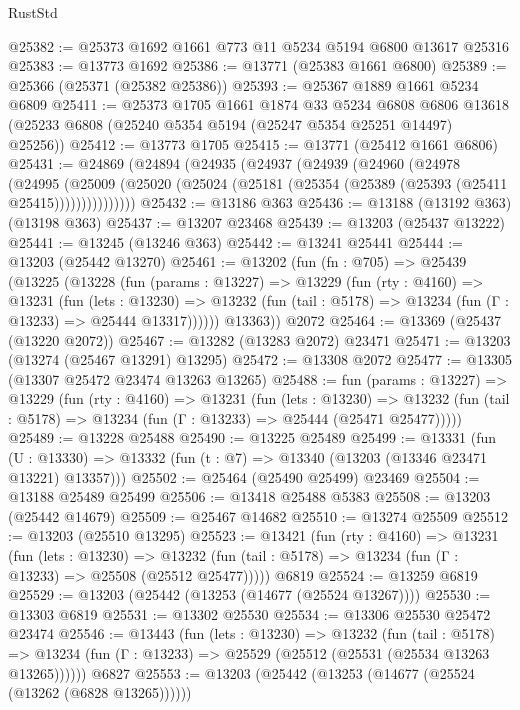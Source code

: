 \begin{lexlean}{RustStd}
\begin{coremodule}
@25382 := @25373 @1692 @1661 @773 @11 @5234 @5194 @6800 @13617 @25316
@25383 := @13773 @1692
@25386 := @13771 (@25383 @1661 @6800)
@25389 := @25366 (@25371 (@25382 @25386))
@25393 := @25367 @1889 @1661 @5234 @6809
@25411 := @25373
    @1705
    @1661
    @1874
    @33
    @5234
    @6808
    @6806
    @13618
    (@25233 @6808 (@25240 @5354 @5194 (@25247 @5354 @25251 @14497) @25256))
@25412 := @13773 @1705
@25415 := @13771 (@25412 @1661 @6806)
@25431 := @24869
    (@24894
      (@24935
        (@24937
          (@24939
            (@24960
              (@24978
                (@24995
                  (@25009
                    (@25020 (@25024 (@25181 (@25354 (@25389 (@25393 (@25411 @25415)))))))))))))))
@25432 := @13186 @363
@25436 := @13188 (@13192 @363) (@13198 @363)
@25437 := @13207 @23468
@25439 := @13203 (@25437 @13222)
@25441 := @13245 (@13246 @363)
@25442 := @13241 @25441
@25444 := @13203 (@25442 @13270)
@25461 := @13202
    (fun (fn : @705) =>
    @25439
      (@13225
        (@13228
          (fun (params : @13227) =>
          @13229
            (fun (rty : @4160) =>
            @13231
              (fun (lets : @13230) =>
              @13232 (fun (tail : @5178) => @13234 (fun (Γ : @13233) => @25444 @13317))))))
        @13363))
    @2072
@25464 := @13369 (@25437 (@13220 @2072))
@25467 := @13282 (@13283 @2072) @23471
@25471 := @13203 (@13274 (@25467 @13291) @13295)
@25472 := @13308 @2072
@25477 := @13305 (@13307 @25472 @23474 @13263 @13265)
@25488 := fun (params : @13227) =>
  @13229
    (fun (rty : @4160) =>
    @13231
      (fun (lets : @13230) =>
      @13232 (fun (tail : @5178) => @13234 (fun (Γ : @13233) => @25444 (@25471 @25477)))))
@25489 := @13228 @25488
@25490 := @13225 @25489
@25499 := @13331
    (fun (U : @13330) => @13332 (fun (t : @7) => @13340 (@13203 (@13346 @23471 @13221) @13357)))
@25502 := @25464 (@25490 @25499) @23469
@25504 := @13188 @25489 @25499
@25506 := @13418 @25488 @5383
@25508 := @13203 (@25442 @14679)
@25509 := @25467 @14682
@25510 := @13274 @25509
@25512 := @13203 (@25510 @13295)
@25523 := @13421
    (fun (rty : @4160) =>
    @13231
      (fun (lets : @13230) =>
      @13232 (fun (tail : @5178) => @13234 (fun (Γ : @13233) => @25508 (@25512 @25477)))))
    @6819
@25524 := @13259 @6819
@25529 := @13203 (@25442 (@13253 (@14677 (@25524 @13267))))
@25530 := @13303 @6819
@25531 := @13302 @25530
@25534 := @13306 @25530 @25472 @23474
@25546 := @13443
    (fun (lets : @13230) =>
    @13232
      (fun (tail : @5178) =>
      @13234 (fun (Γ : @13233) => @25529 (@25512 (@25531 (@25534 @13263 @13265))))))
    @6827
@25553 := @13203 (@25442 (@13253 (@14677 (@25524 (@13262 (@6828 @13265))))))

\end{coremodule}
\end{lexlean}
